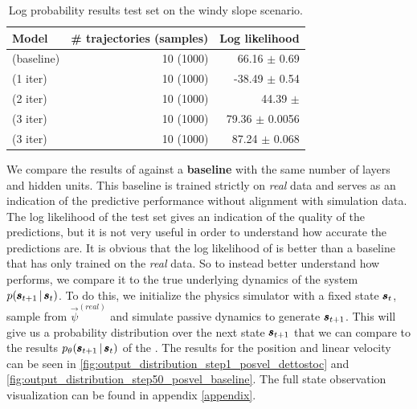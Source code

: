 \begin{table}
\centering
\begin{tabular}{lrr}
\toprule
Model & \# trajectories (samples) & Log likelihood  \\
\midrule
\cvae{} (baseline) & 10 (1000) & 66.16 $\pm$ 0.69\\


\dettostoc{} (1 iter) & 10 (1000) & -38.49 $\pm$ 0.54 \\
\dettostoc{} (2 iter) & 10 (1000) & 44.39 $\pm$  \\
\dettostoc{} (3 iter) & 10 (1000) & 79.36 $\pm$ 0.0056 \\
\dettostoc{} (3 iter) & 10 (1000) & 87.24 $\pm$ 0.068 \\

\bottomrule
\end{tabular}
\caption{Log probability results test set on the windy slope scenario.}
\label{fig:windyslope_logprob}
\end{table}

We compare the results of \dettostoc{} against a \textbf{baseline} \cvae{} with the same number of layers and hidden units. This baseline \cvae{} is trained strictly on \emph{real} data and serves as an indication of the predictive performance without alignment with simulation data.
The log likelihood of the test set gives an indication of the quality of the predictions, but it is not very useful in order to understand how accurate the predictions are. It is obvious that the log likelihood of \dettostoc{} is better than a \cvae{} baseline that has only trained on the \emph{real} data. So to instead better understand how \dettostoc{} performs, we compare it to the true underlying dynamics of the system $p \given{\vns}{\vs}$. To do this, we initialize the physics simulator with a fixed state $\pmb{s}_t$, sample from $\vec{\psi}^{(real)}$ and simulate passive dynamics to generate $\pmb{s}_{t+1}$. This will give us a probability distribution over the next state $\pmb{s}_{t+1}$ that we can compare to the results $\ptheta \given{\vns}{\vs}$ of the \cvae{}. The results for the position and linear velocity can be seen in \ref{fig:output_distribution_step1_posvel_dettostoc} and \ref{fig:output_distribution_step50_posvel_baseline}. The full state observation visualization can be found in appendix \ref{appendix}.

